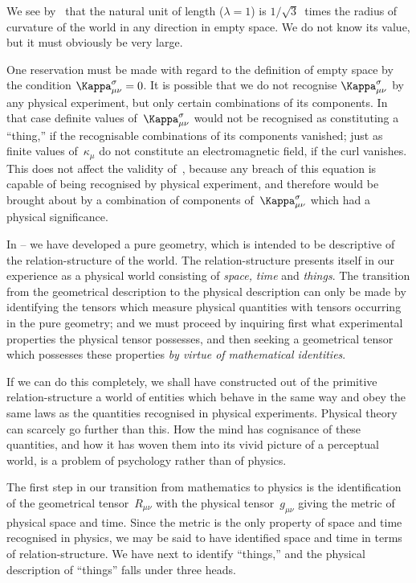\documentclass[12pt]{book}
\begin{document}
We see by~ that the natural unit of length ($\lambda= 1$) is $1/\sqrt{3}$~times the
radius of curvature of the world in any direction in empty space. We do not
know its value, but it must obviously be very large.

One reservation must be made with regard to the definition of empty
space by the condition $\Kappa_{\mu\nu}^{\sigma} = 0$. It is possible that we do not recognise $\Kappa_{\mu\nu}^{\sigma}$ by
any physical experiment, but only certain combinations of its components. In
that case definite values of~$\Kappa_{\mu\nu}^{\sigma}$ would not be recognised as constituting a
``thing,'' if the recognisable combinations of its components vanished; just as
finite values of~$\kappa_{\mu}$ do not constitute an electromagnetic field, if the curl
vanishes. This does not affect the validity of~, because any breach of
this equation is capable of being recognised by physical experiment, and
therefore would be brought about by a combination of components of~$\Kappa_{\mu\nu}^{\sigma}$ which
had a physical significance.

%
%

In -- we have developed a pure geometry, which is intended to be descriptive
of the relation\hyp{}structure of the world. The relation\hyp{}structure presents
itself in our experience as a physical world consisting of \emph{space,} \emph{time} and \emph{things}.
The transition from the geometrical description to the physical description
can only be made by identifying the tensors which measure physical quantities
with tensors occurring in the pure geometry; and we must proceed by
inquiring first what experimental properties the physical tensor possesses,
and then seeking a geometrical tensor which possesses these properties \emph{by
virtue of mathematical identities}.

If we can do this completely, we shall have constructed out of the primitive
relation\hyp{}structure a world of entities which behave in the same way and obey
the same laws as the quantities recognised in physical experiments. Physical
theory can scarcely go further than this. How the mind has cognisance of
these quantities, and how it has woven them into its vivid picture of a perceptual
world, is a problem of psychology rather than of physics.

The first step in our transition from mathematics to physics is the identification
of the geometrical tensor~$R_{\mu\nu}$ with the physical tensor~$g_{\mu\nu}$ giving the
metric of physical space and time. Since the metric is the only property of
space and time recognised in physics, we may be said to have identified space
and time in terms of relation\hyp{}structure. We have next to identify ``things,''
and the physical description of ``things'' falls under three heads.
\end{document}
